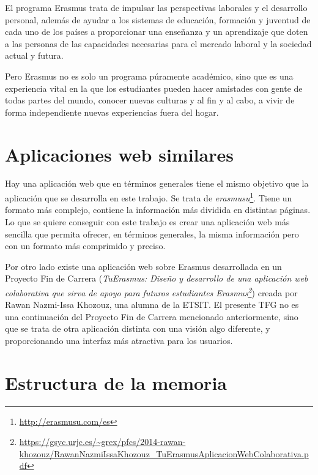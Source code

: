 \documentclass[a4paper, 12pt]{book}
\begin{document}
El programa Erasmus trata de impulsar las perspectivas laborales y el desarrollo personal, además de ayudar a los sistemas de educación, formación y juventud  de cada uno de los países a proporcionar una enseñanza y un aprendizaje que doten a las personas de las capacidades necesarias para el mercado laboral y la sociedad actual y futura.
\newline

Pero Erasmus no es solo un programa púramente académico, sino que es una experiencia vital en la que los estudiantes pueden hacer amistades con gente de todas partes del mundo, conocer nuevas culturas y al fin y al cabo, a vivir de forma independiente nuevas experiencias fuera del hogar.


\section{Aplicaciones web similares}
\label{sec:aplicaciones-web-similares}

Hay una aplicación web que en términos generales tiene el mismo objetivo que la aplicación que se desarrolla en este trabajo. Se trata de \textit{erasmusu}\footnote{\url{http://erasmusu.com/es}}. Tiene un formato más complejo, contiene la información más dividida en distintas páginas. Lo que se quiere conseguir con este trabajo es crear una aplicación web más sencilla que permita ofrecer, en términos generales, la misma información pero con un formato más comprimido y preciso.
\newline

Por otro lado existe una aplicación web sobre Erasmus desarrollada en un Proyecto Fin de Carrera (\textit{TuErasmus: Diseño y desarrollo de una aplicación web colaborativa que sirva de apoyo para futuros estudiantes Erasmus\footnote{\url{https://gsyc.urjc.es/~grex/pfcs/2014-rawan-khozouz/RawanNazmiIssaKhozouz_TuErasmusAplicacionWebColaborativa.pdf}}}) creada por Rawan Nazmi-Issa Khozouz, una alumna de la ETSIT. El presente TFG no es una continuación del Proyecto Fin de Carrera mencionado anteriormente, sino que se trata de otra aplicación distinta con una visión algo diferente, y proporcionando una interfaz más atractiva para los usuarios.

\section{Estructura de la memoria}
\label{sec:estructura-memoria}
\end{document}
